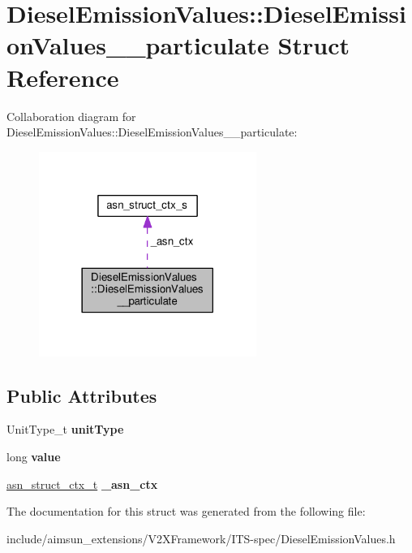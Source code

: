 \hypertarget{structDieselEmissionValues_1_1DieselEmissionValues____particulate}{}\section{Diesel\+Emission\+Values\+:\+:Diesel\+Emission\+Values\+\_\+\+\_\+particulate Struct Reference}
\label{structDieselEmissionValues_1_1DieselEmissionValues____particulate}


Collaboration diagram for Diesel\+Emission\+Values\+:\+:Diesel\+Emission\+Values\+\_\+\+\_\+particulate\+:\nopagebreak
\begin{figure}[H]
\begin{center}
\leavevmode
\includegraphics[width=201pt]{structDieselEmissionValues_1_1DieselEmissionValues____particulate__coll__graph}
\end{center}
\end{figure}
\subsection*{Public Attributes}
\begin{DoxyCompactItemize}
\item 
Unit\+Type\+\_\+t {\bfseries unit\+Type}\hypertarget{structDieselEmissionValues_1_1DieselEmissionValues____particulate_a826dc25f899627edf8f8b37842637c54}{}\label{structDieselEmissionValues_1_1DieselEmissionValues____particulate_a826dc25f899627edf8f8b37842637c54}

\item 
long {\bfseries value}\hypertarget{structDieselEmissionValues_1_1DieselEmissionValues____particulate_a05084b2a7c58953c7d8a387dad5350e2}{}\label{structDieselEmissionValues_1_1DieselEmissionValues____particulate_a05084b2a7c58953c7d8a387dad5350e2}

\item 
\hyperlink{structasn__struct__ctx__s}{asn\+\_\+struct\+\_\+ctx\+\_\+t} {\bfseries \+\_\+asn\+\_\+ctx}\hypertarget{structDieselEmissionValues_1_1DieselEmissionValues____particulate_a38146550eb78d9c68f07dbaf5dea505b}{}\label{structDieselEmissionValues_1_1DieselEmissionValues____particulate_a38146550eb78d9c68f07dbaf5dea505b}

\end{DoxyCompactItemize}


The documentation for this struct was generated from the following file\+:\begin{DoxyCompactItemize}
\item 
include/aimsun\+\_\+extensions/\+V2\+X\+Framework/\+I\+T\+S-\/spec/Diesel\+Emission\+Values.\+h\end{DoxyCompactItemize}
